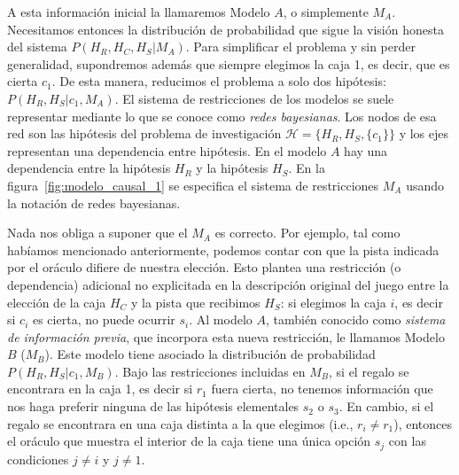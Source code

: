 \documentclass[a4paper,11pt]{book}
\theoremstyle{definition}
\begin{document}

A esta informaci\'on inicial la llamaremos Modelo $A$, o simplemente $M_A$.
%
Necesitamos entonces la distribuci\'on de probabilidad que sigue la visi\'on honesta del sistema $P(H_R,H_C,H_S|M_A)$.
%
Para simplificar el problema y sin perder generalidad, supondremos adem\'as que siempre elegimos la caja 1, es decir,  que es cierta $c_1$. 
De esta manera, reducimos el problema a solo dos hip\'otesis: $P(H_R,H_S|c_1, M_A)$.
%
El sistema de restricciones de los modelos se suele representar mediante lo que se conoce como \emph{redes bayesianas}.
%
Los nodos de esa red son las hip\'otesis del problema de investigaci\'on $\mathcal{H} = \{H_R, H_S, \{c_1\}\}$ y los ejes representan una dependencia entre hip\'otesis.
%
En el modelo $A$ hay una dependencia entre la hip\'otesis $H_R$ y la hip\'otesis $H_S$.
%
En la figura~\ref{fig:modelo_causal_1} se especifica el sistema de restricciones $M_A$ usando la notaci\'on de redes bayesianas.


Nada nos obliga a suponer que el $M_A$ es correcto.
%
Por ejemplo, tal como hab\'iamos mencionado anteriormente, podemos contar con que la pista indicada por el or\'aculo difiere de nuestra elecci\'on. 
Esto plantea una restricci\'on (o dependencia) adicional no explicitada en la descripci\'on original del juego entre la elecci\'on de la caja $H_C$ y la pista que recibimos $H_S$: si elegimos la caja $i$, es decir si $c_i$ es cierta, no puede ocurrir $s_i$.
%
Al modelo $A$, tambi\'en conocido como \emph{sistema de informaci\'on previa}, que incorpora esta nueva restricci\'on, le llamamos Modelo $B$ ($M_B$). 
Este modelo tiene asociado la distribuci\'on de probabilidad $P(H_R,H_S|c_1,M_B)$.
%
Bajo las restricciones incluidas  en $M_B$, si el regalo se encontrara en la caja 1, es decir si $r_1$ fuera cierta, no tenemos informaci\'on que nos haga preferir ninguna de las hip\'otesis elementales $s_2$ o $s_3$.
%
En cambio, si el regalo se encontrara en una caja distinta a la que elegimos (i.e., $r_i \neq r_1$), entonces el or\'aculo que muestra el interior de la caja tiene una \'unica opci\'on $s_j$ con las condiciones $j\neq i$ y $j\neq 1$.
\end{document}
